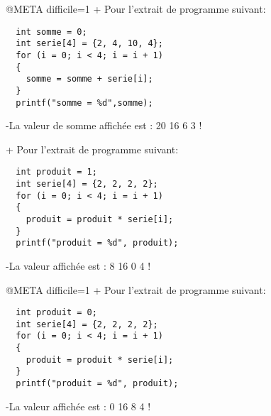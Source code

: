 @META difficile=1
+ Pour l'extrait de programme suivant: 
 \begin{verbatim} 
  int somme = 0;
  int serie[4] = {2, 4, 10, 4};
  for (i = 0; i < 4; i = i + 1) 
  {
    somme = somme + serie[i];
  }
  printf("somme = %d",somme); 
\end{verbatim}
-La valeur de somme affichée est : 
 20
 16
 6
 3
!

+ Pour l'extrait de programme suivant: 
 \begin{verbatim} 
  int produit = 1;
  int serie[4] = {2, 2, 2, 2};
  for (i = 0; i < 4; i = i + 1) 
  {
    produit = produit * serie[i];
  }
  printf("produit = %d", produit); 
\end{verbatim}
-La valeur affichée est : 
 8
 16
 0
 4
!

@META difficile=1
+ Pour l'extrait de programme suivant: 
 \begin{verbatim} 
  int produit = 0;
  int serie[4] = {2, 2, 2, 2};
  for (i = 0; i < 4; i = i + 1) 
  {
    produit = produit * serie[i];
  }
  printf("produit = %d", produit); 
\end{verbatim}
-La valeur affichée est : 
 0
 16
 8
 4
!
